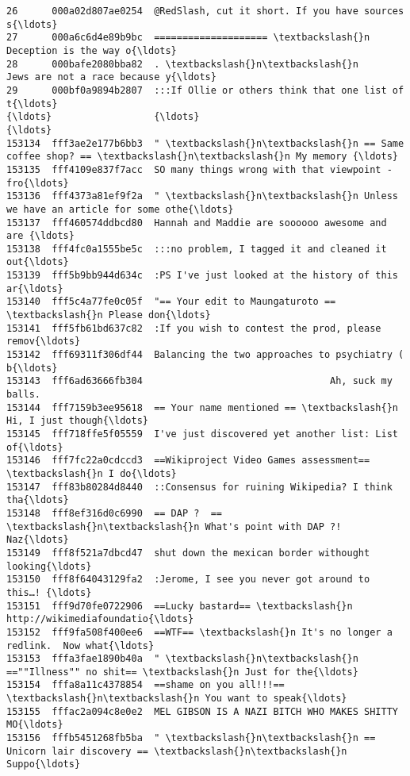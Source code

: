 \documentclass[11pt]{article}
\begin{document}
\begin{Verbatim}[commandchars=\\\{\}]
26      000a02d807ae0254  @RedSlash, cut it short. If you have sources s{\ldots}
27      000a6c6d4e89b9bc  ==================== \textbackslash{}n Deception is the way o{\ldots}
28      000bafe2080bba82  . \textbackslash{}n\textbackslash{}n           Jews are not a race because y{\ldots}
29      000bf0a9894b2807  :::If Ollie or others think that one list of t{\ldots}
{\ldots}                  {\ldots}                                                {\ldots}
153134  fff3ae2e177b6bb3  " \textbackslash{}n\textbackslash{}n == Same coffee shop? == \textbackslash{}n\textbackslash{}n My memory {\ldots}
153135  fff4109e837f7acc  SO many things wrong with that viewpoint - fro{\ldots}
153136  fff4373a81ef9f2a  " \textbackslash{}n\textbackslash{}n Unless we have an article for some othe{\ldots}
153137  fff460574ddbcd80  Hannah and Maddie are soooooo awesome and are {\ldots}
153138  fff4fc0a1555be5c  :::no problem, I tagged it and cleaned it out{\ldots}
153139  fff5b9bb944d634c  :PS I've just looked at the history of this ar{\ldots}
153140  fff5c4a77fe0c05f  "== Your edit to Maungaturoto == \textbackslash{}n Please don{\ldots}
153141  fff5fb61bd637c82  :If you wish to contest the prod, please remov{\ldots}
153142  fff69311f306df44  Balancing the two approaches to psychiatry ( b{\ldots}
153143  fff6ad63666fb304                                 Ah, suck my balls.
153144  fff7159b3ee95618  == Your name mentioned == \textbackslash{}n Hi, I just though{\ldots}
153145  fff718ffe5f05559  I've just discovered yet another list: List of{\ldots}
153146  fff7fc22a0cdccd3  ==Wikiproject Video Games assessment== \textbackslash{}n I do{\ldots}
153147  fff83b80284d8440  ::Consensus for ruining Wikipedia? I think tha{\ldots}
153148  fff8ef316d0c6990  == DAP ?  == \textbackslash{}n\textbackslash{}n What's point with DAP ?! Naz{\ldots}
153149  fff8f521a7dbcd47  shut down the mexican border withought looking{\ldots}
153150  fff8f64043129fa2  :Jerome, I see you never got around to this…! {\ldots}
153151  fff9d70fe0722906  ==Lucky bastard== \textbackslash{}n http://wikimediafoundatio{\ldots}
153152  fff9fa508f400ee6  ==WTF== \textbackslash{}n It's no longer a redlink.  Now what{\ldots}
153153  fffa3fae1890b40a  " \textbackslash{}n\textbackslash{}n ==""Illness"" no shit== \textbackslash{}n Just for the{\ldots}
153154  fffa8a11c4378854  ==shame on you all!!!== \textbackslash{}n\textbackslash{}n You want to speak{\ldots}
153155  fffac2a094c8e0e2  MEL GIBSON IS A NAZI BITCH WHO MAKES SHITTY MO{\ldots}
153156  fffb5451268fb5ba  " \textbackslash{}n\textbackslash{}n == Unicorn lair discovery == \textbackslash{}n\textbackslash{}n Suppo{\ldots}

\end{Verbatim}
\end{document}
